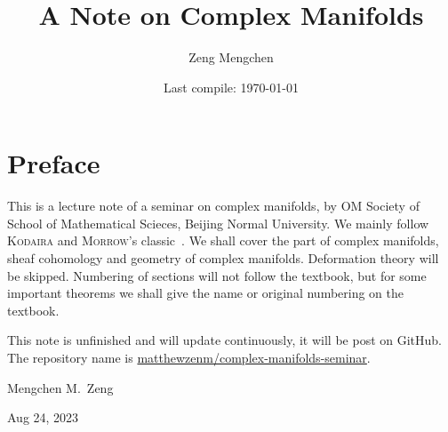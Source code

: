 \documentclass[a4paper]{book}
\title{A Note on Complex Manifolds}
\author{Zeng Mengchen}
\date{Last compile: \today}
\theoremstyle{definition}
\theoremstyle{plain}
\theoremstyle{remark}
\begin{document}
\maketitle
\thispagestyle{empty}

\frontmatter

\tableofcontents
\newpage
\thispagestyle{empty}

\chapter{Preface}

This is a lecture note of a seminar on complex manifolds, by OM Society of School of Mathematical Scieces, Beijing Normal University.
We mainly follow \textsc{Kodaira} and \textsc{Morrow}'s classic~\cite{Kodaira06}.
We shall cover the part of complex manifolds, sheaf cohomology and geometry of complex manifolds.
Deformation theory will be skipped.
Numbering of sections will not follow the textbook, but for some important theorems we shall give the name or original numbering on the textbook.

This note is unfinished and will update continuously, it will be post on GitHub.
The repository name is \href{https://github.com/matthewzenm/complex-manifolds-seminar}{matthewzenm/complex-manifolds-seminar}.

\begin{flushright}
    Mengchen M.\ Zeng

    Aug 24, 2023
\end{flushright}

\newpage
\thispagestyle{empty}

\mainmatter



\backmatter


\end{document}
